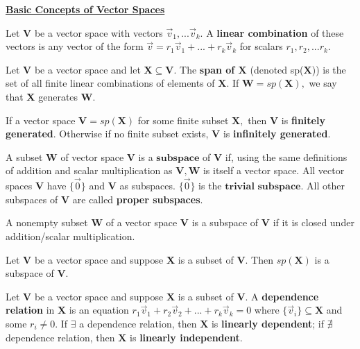 \documentclass{article}
\begin{document}
\underline{\textbf{Basic Concepts of Vector Spaces}}
\begin{definition}
Let $\boldsymbol{V}$ be a vector space with vectors $\vec{v}_{1}, ... \vec{v}_{k}.$ A \textbf{linear combination} of these vectors is any vector of the form $\vec{v} = r_1\vec{v}_{1} + ... + r_k\vec{v}_{k}$ for scalars $r_1, r_2, ... r_k.$
\end{definition}

\begin{definition}
Let $\boldsymbol{V}$ be a vector space and let $\boldsymbol{X} \subseteq \boldsymbol{V}.$ The \textbf{span of $\boldsymbol{X}$} (denoted sp($\boldsymbol{X}$)) is the set of all finite linear combinations of elements of $\boldsymbol{X}.$ If $\boldsymbol{W} = sp(\boldsymbol{X}),$ we say that $\boldsymbol{X}$ generates $\boldsymbol{W}.$
\end{definition}

\begin{definition}
If a vector space $\boldsymbol{V} = sp(\boldsymbol{X})$ for some finite subset $\boldsymbol{X},$ then $\boldsymbol{V}$ is \textbf{finitely generated}. Otherwise if no finite subset exists, $\boldsymbol{V}$ is \textbf{infinitely generated}.
\end{definition}

\begin{definition}
A subset $\boldsymbol{W}$ of vector space $\boldsymbol{V}$ is a $\textbf{subspace}$ of $\boldsymbol{V}$ if, using the same definitions of addition and scalar multiplication as $\boldsymbol{V}, \boldsymbol{W}$ is itself a vector space. All vector spaces $\boldsymbol{V}$ have $\{\vec{0}\}$ and $\boldsymbol{V}$ as subspaces. $\{\vec{0}\}$ is the $\textbf{trivial subspace}.$ All other subspaces of $\boldsymbol{V}$ are called \textbf{proper subspaces}.
\end{definition}

\begin{theorem}
A nonempty subset $\boldsymbol{W}$ of a vector space $\boldsymbol{V}$ is a subspace of $\boldsymbol{V}$ if it is closed under addition/scalar multiplication. 
\end{theorem}

\begin{corollary}
Let $\boldsymbol{V}$ be a vector space and suppose $\boldsymbol{X}$ is a subset of $\boldsymbol{V}.$ Then $sp(\boldsymbol{X})$ is a subspace of $\boldsymbol{V}.$
\end{corollary}

\begin{definition}
Let $\boldsymbol{V}$ be a vector space and suppose $\boldsymbol{X}$ is a subset of $\boldsymbol{V}.$ A \textbf{dependence relation} in $\boldsymbol{X}$ is an equation $r_1\vec{v}_{1} + r_2\vec{v}_{2} + ... + r_k\vec{v}_{k} = 0$ where $\{\vec{v}_{i}\} \subseteq \boldsymbol{X}$ and some $r_i \neq 0.$ If $\exists$ a dependence relation, then $\boldsymbol{X}$ is \textbf{linearly dependent}; if $\nexists$ dependence relation, then $\boldsymbol{X}$ is \textbf{linearly independent}.
\end{definition}
\end{document}
